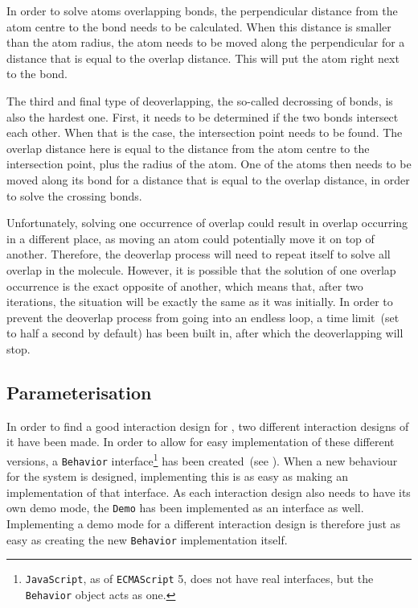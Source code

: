 In order to solve atoms overlapping bonds, the perpendicular distance from the atom centre to the bond needs to be calculated. When this distance is smaller than the atom radius, the atom needs to be moved along the perpendicular for a distance that is equal to the overlap distance. This will put the atom right next to the bond.

The third and final type of deoverlapping, the so-called decrossing of bonds, is also the hardest one. First, it needs to be determined if the two bonds intersect each other. When that is the case, the intersection point needs to be found. The overlap distance here is equal to the distance from the atom centre to the intersection point, plus the radius of the atom. One of the atoms then needs to be moved along its bond for a distance that is equal to the overlap distance, in order to solve the crossing bonds.

Unfortunately, solving one occurrence of overlap could result in overlap occurring in a different place, as moving an atom could potentially move it on top of another. Therefore, the deoverlap process will need to repeat itself to solve all overlap in the molecule. However, it is possible that the solution of one overlap occurrence is the exact opposite of another, which means that, after two iterations, the situation will be exactly the same as it was initially. In order to prevent the deoverlap process from going into an endless loop, a time limit~(set to half a second by default) has been built in, after which the deoverlapping will stop.


\subsection{Parameterisation}
In order to find a good interaction design for \oframp, two different interaction designs of it have been made. In order to allow for easy implementation of these different versions, a \verb|Behavior| interface\footnote{\texttt{JavaScript}, as of \texttt{ECMAScript} 5, does not have real interfaces, but the \texttt{Behavior} object acts as one.} has been created~(see ). When a new behaviour for the system is designed, implementing this is as easy as making an implementation of that interface. As each interaction design also needs to have its own demo mode, the \verb|Demo| has been implemented as an interface as well. Implementing a demo mode for a different interaction design is therefore just as easy as creating the new \verb|Behavior| implementation itself.


